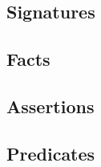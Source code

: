 \newcommand{\showCode}[2]{
    
}

\subsection{Signatures}
\showCode{2}{62}
\subsection{Facts}
\showCode{65}{190}
\subsection{Assertions}
\showCode{194}{225}
\subsection{Predicates}
\showCode{229}{237}
